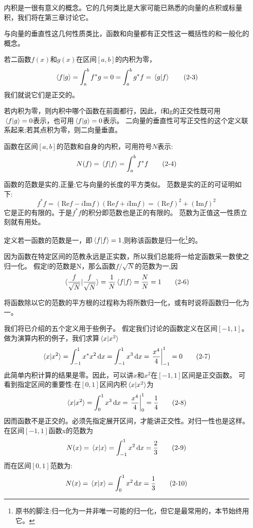 内积是一很有意义的概念。它的几何类比是大家可能已熟悉的向量的点积或标量积，我们将在第三章讨论它。

与向量的垂直性这几何性质类比，函数和向量都有正交性这一概括性的和一般化的概念。
\begin{definition}[正交]
    若二函数$f(x)$和$g(x)$在区间$[a,b]$的内积为零，
    \[\bra*{f}\ket*{g}=\int_a^bf^*g=0=\int_a^bg^*f=\bra*{g}\ket*{f} \tag{2-3}\]
    我们就说它们是正交的。
\end{definition}

若内积为零，则内积中哪个函数在前面都行，因此，f和g的正交性既可用$\bra*{f}\ket*{g}=0$表示，也可用$\bra*{f}\ket*{g}=0$表示。
二向量的垂直性可写正交性的这个定义联系起来;若其点积为零，则二向量垂直。

\begin{definition}[范数]
    函数在区间$[a,b]$的范数和自身的内积，可用符号$N$表示:
    \[N(f)=\bra*{f}\ket*{f}=\int_a^bf^*f \tag{2-4}\]
\end{definition}

函数的范数是实的,正量;它与向量的长度的平方类似。
范数是实的正的可证明如下:
\[f^*f=(\text{Re} f-i\text{Im} f)(\text{Re} f+i\text{Im} f)=(\text{Re} f)^2+(\text{Im} f)^2 \tag{2-5}\]
它是正的有限的。于是$f^*f$的积分即范数也是正的有限的。
范数为正值这一性质立刻就有用处。

\begin{definition}[归一性]
    定义若一函数的范数是一，即$\bra*{f}\ket*{f}=1$,则称该函数是归一化\footnote{原书的脚注:归一化为一井非唯一可能的归一化，但它是最常用的，本节始终用它。}的。
\end{definition}

因为函数在特定区间的范教永远是正实数，所以我们总能将一给定函数采一数使之归一化。
假定f的范数是N，那么函数$f/\sqrt{N}$的范数为一,因
\[\bra*{\frac{f}{\sqrt{N}}}\ket*{\frac{f}{\sqrt{N}}}=\frac{1}{N}\bra*{f}\ket*{f}=\frac{N}{N}=1 \tag{2-6}\]

将函数除以它的范数的平方根的过程称为将所数归一化，或有时说将函数归一化为一。

我们将已介绍的五个定义用于些例子。
假定我们讨论的函数定义在区间$[-1,1]$。做为演算内积的例子，我们求算$\bra*{x}\ket*{x^2}$
\[\bra*{x}\ket*{x^2}=\int_{-1}^1x^*x^2\dd{x}=\int_{-1}^1x^3\dd{x}= \eval{\frac{x^4}{4}}_{-1}^1=0 \tag{2-7}\]
此简单内积计算的结果是零。因此，可以讲$x$和$x^2$在$[-1,1]$区间是正交函数。
可看到指定区间的重要性:在$[0,1]$区间内积$\bra*{x}\ket*{x^2}$为
\[\bra*{x}\ket*{x^2}=\int_0^1x^3\dd{x}= \eval{\frac{x^4}{4}}_0^1=\frac{1}{4} \tag{2-8}\]
因而函数不是正交的。必须先指定展开区间，才能讲正交性。对归一性也是这样。
在区间$[-1,1]$函数x的范数为
\[N(x)=\bra*{x}\ket*{x}=\int_{-1}^{1}x^2\dd{x}=\frac{2}{3} \tag{2-9}\]
而在区间$[0,1]$范数为:
\[N(x)=\bra*{x}\ket*{x}=\int_{0}^{1}x^2\dd{x}=\frac{1}{3} \tag{2-10}\]

